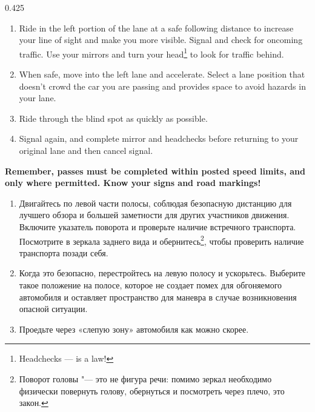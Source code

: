 

\begin{langblock}{0.425}
	\begin{eng}
	\begin{enumerate}[noitemsep]
		\item Ride in the left portion of the lane at a safe following distance to increase your line of sight and make you more visible. Signal and check for oncoming traffic. Use your mirrors and turn your head\footnote{Headchecks --- is a law!\label{headchecksEN}} to look for traffic behind.
		
		\item When safe, move into the left lane and accelerate. Select a lane position that doesn't crowd the car you are passing and provides space to avoid hazards in your lane.
		
		\item Ride through the blind spot as quickly as possible.
		
		\item Signal again, and complete mirror and headchecks before returning to your original lane and then cancel signal.
		
	\end{enumerate}
	{
		\bfseries
		Remember, passes must be completed within posted speed limits, and only where permitted.  Know your signs and road markings!
	}
	\end{eng}
	\begin{rus}
		\begin{enumerate}[noitemsep]
			\item Двигайтесь по левой части полосы, соблюдая безопасную дистанцию для лучшего обзора и большей заметности для других участников движения. Включите указатель поворота и проверьте наличие встречного транспорта. Посмотрите в зеркала заднего вида и обернитесь\footnote{Поворот головы "--- это не фигура речи: помимо зеркал необходимо физически повернуть голову, обернуться и посмотреть через плечо, это закон.\label{headchecksRU}}, чтобы проверить наличие транспорта позади себя.
			
			\item Когда это безопасно, перестройтесь на левую полосу и ускорьтесь. Выберите такое положение на полосе, которое не создает помех для обгоняемого автомобиля и оставляет пространство для маневра в случае возникновения опасной ситуации.
			
			\item Проедьте через «слепую зону» автомобиля как можно скорее.
			

\end{enumerate}
\end{rus}
\end{langblock}

